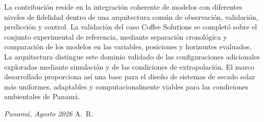La contribución reside en la integración coherente de modelos con diferentes niveles de fidelidad dentro de una arquitectura común de observación, validación, predicción y control. La validación del caso Coffee Solutions se completó sobre el conjunto experimental de referencia, mediante separación cronológica y comparación de los modelos en las variables, posiciones y horizontes evaluados. La arquitectura distingue este dominio validado de las configuraciones adicionales exploradas mediante simulación y de las condiciones de extrapolación. El marco desarrollado proporciona así una base para el diseño de sistemas de secado solar más uniformes, adaptables y computacionalmente viables para las condiciones ambientales de Panamá.




\bigskip
 
\noindent\textit{Panamá, Agosto 2026}
\hfill A.~R.
